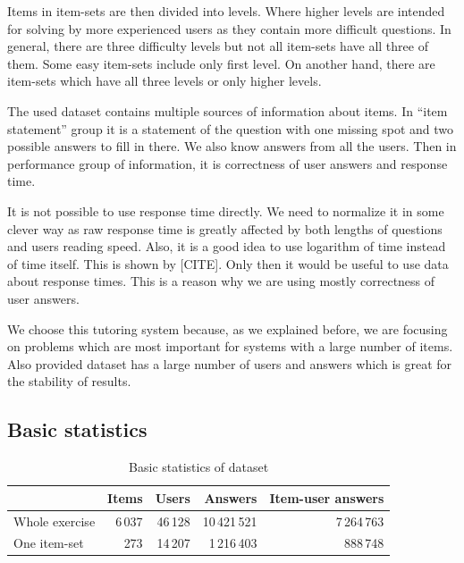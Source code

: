 \documentclass[
  digital, %
  table,   %
  nolof,     %
  nolot,     %
  nocover,
  color
]{fithesis3}
\begin{document}
Items in item-sets are then divided into levels. Where higher levels are intended for solving by more experienced users as they contain more difficult questions. In general, there are three difficulty levels but not all item-sets have all three of them. Some easy item-sets include only first level. On another hand, there are item-sets which have all three levels or only higher levels.


The used dataset contains multiple sources of information about items. In ``item statement'' group it is a statement of the question with one missing spot and two possible answers to fill in there. We also know answers from all the users. Then in performance group of information, it is correctness of user answers and response time.

It is not possible to use response time directly. We need to normalize it in some clever way as raw response time is greatly affected by both lengths of questions and users reading speed. Also, it is a good idea to use logarithm of time instead of time itself. This is shown by [CITE]. Only then it would be useful to use data about response times. This is a reason why we are using mostly correctness of user answers.


We choose this tutoring system because, as we explained before, we are focusing on problems which are most important for systems with a large number of items. Also provided dataset has a large number of users and answers which is great for the stability of results.


\subsection{Basic statistics}\label{basic-statistics}

\begin{table}
  \begin{tabular}{|l|r r r r|}
    \hline
     & Items & Users & Answers & Item-user answers \\
    \hline\hline
    Whole exercise & 6\,037 & 46\,128 & 10\,421\,521 & 7\,264\,763 \\
    \hline
    One item-set & 273 & 14\,207 & 1\,216\,403 & 888\,748 \\
    \hline
  \end{tabular}
  \caption{Basic statistics of dataset}
  \label{tab:basic-statistics}
\end{table}
\end{document}
